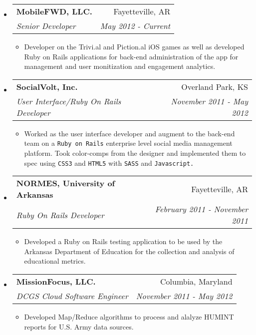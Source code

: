 \documentclass[letterpaper,13pt]{article}
\makeatletter
\newcommand{\resitem}[1]{\item #1 \vspace{-2pt}}
\newcommand{\ressubheading}[4]{

\begin{tabular*}{6.5in}{l@{\cftdotfill{\cftsecdotsep}\extracolsep{\fill}}r}

		\textbf{#1} & #2 \\

		\textit{#3} & \textit{#4} \\

\end{tabular*}\vspace{-4pt}}
\makeatother
\begin{document}
\begin{itemize}

\item

	\ressubheading{MobileFWD, LLC.}{Fayetteville, AR}{Senior Developer}{May 2012 - Current}

	\begin{itemize}

		\resitem{Developer on the Trivi.al and Piction.al iOS games as well as developed Ruby on Rails applications for back-end administration of the app for management and user monitization and engagement analytics.}

	\end{itemize}
	
\item

	\ressubheading{SocialVolt, Inc.}{Overland Park, KS}{User Interface/Ruby On Rails Developer}{November 2011 - May 2012}

	\begin{itemize}

		\resitem{Worked as the user interface developer and augment to the back-end team on a \texttt{Ruby on Rails} enterprise level social media management platform. Took color-comps from the designer and implemented them to spec using \texttt{CSS3} and \texttt{HTML5} with \texttt{SASS} and \texttt{Javascript.}}

	\end{itemize}
	
\item

	\ressubheading{NORMES, University of Arkansas}{Fayetteville, AR}{Ruby On Rails Developer}{February 2011 - November 2011}

	\begin{itemize}

		\resitem{Developed a Ruby on Rails testing application to be used by the Arkansas Department of Education for the collection and analysis of educational metrics.}

	\end{itemize}
	
\item

	\ressubheading{MissionFocus, LLC.}{Columbia, Maryland}{DCGS Cloud Software Engineer}{November 2011 - May 2012}

	\begin{itemize}

		\resitem{Developed Map/Reduce algorithms to process and alalyze HUMINT reports for U.S. Army data sources.}
		

\end{itemize}
\end{itemize}
\end{document}
